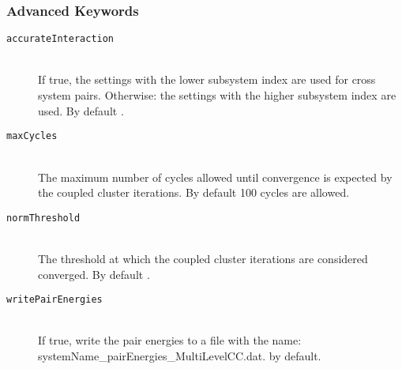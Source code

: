 \subsubsection{Advanced Keywords}
\begin{description}
  \item[\texttt{accurateInteraction}]\hfill\\
  If true, the settings with the lower subsystem index are used for cross system pairs.
  Otherwise: the settings with the higher subsystem index are used. By default .
  \item [\texttt{maxCycles}]\hfill \\
  The maximum number of cycles allowed until convergence is expected by the coupled cluster iterations.
  By default 100 cycles are allowed.
  \item [\texttt{normThreshold}]\hfill \\
  The threshold at which the coupled cluster iterations are considered converged. By default .
  \item[\texttt{writePairEnergies}] \hfill \\
  If true, write the pair energies to a file with the name: systemName\_pairEnergies\_MultiLevelCC.dat.  by default.
\end{description}
